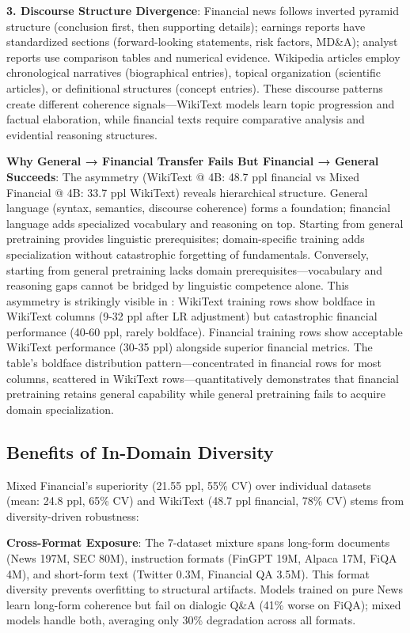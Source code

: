 \textbf{3. Discourse Structure Divergence}: Financial news follows inverted pyramid structure (conclusion first, then supporting details); earnings reports have standardized sections (forward-looking statements, risk factors, MD\&A); analyst reports use comparison tables and numerical evidence. Wikipedia articles employ chronological narratives (biographical entries), topical organization (scientific articles), or definitional structures (concept entries). These discourse patterns create different coherence signals—WikiText models learn topic progression and factual elaboration, while financial texts require comparative analysis and evidential reasoning structures.

\textbf{Why General → Financial Transfer Fails But Financial → General Succeeds}: The asymmetry (WikiText @ 4B: 48.7 ppl financial vs Mixed Financial @ 4B: 33.7 ppl WikiText) reveals hierarchical structure. General language (syntax, semantics, discourse coherence) forms a foundation; financial language adds specialized vocabulary and reasoning on top. Starting from general pretraining provides linguistic prerequisites; domain-specific training adds specialization without catastrophic forgetting of fundamentals. Conversely, starting from general pretraining lacks domain prerequisites—vocabulary and reasoning gaps cannot be bridged by linguistic competence alone. This asymmetry is strikingly visible in : WikiText training rows show boldface in WikiText columns (9-32 ppl after LR adjustment) but catastrophic financial performance (40-60 ppl, rarely boldface). Financial training rows show acceptable WikiText performance (30-35 ppl) alongside superior financial metrics. The table's boldface distribution pattern—concentrated in financial rows for most columns, scattered in WikiText rows—quantitatively demonstrates that financial pretraining retains general capability while general pretraining fails to acquire domain specialization.

\subsection{Benefits of In-Domain Diversity}

Mixed Financial's superiority (21.55 ppl, 55\% CV) over individual datasets (mean: 24.8 ppl, 65\% CV) and WikiText (48.7 ppl financial, 78\% CV) stems from diversity-driven robustness:

\textbf{Cross-Format Exposure}: The 7-dataset mixture spans long-form documents (News 197M, SEC 80M), instruction formats (FinGPT 19M, Alpaca 17M, FiQA 4M), and short-form text (Twitter 0.3M, Financial QA 3.5M). This format diversity prevents overfitting to structural artifacts. Models trained on pure News learn long-form coherence but fail on dialogic Q\&A (41\% worse on FiQA); mixed models handle both, averaging only 30\% degradation across all formats.

